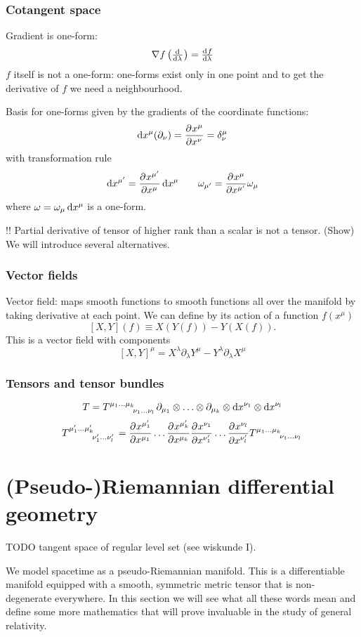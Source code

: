 \subsection{Cotangent space}
Gradient is one-form:
\[ \grad{f}\left(\od{}{\lambda}\right) = \od{f}{\lambda} \]
$f$ itself is not a one-form: one-forms exist only in one point and to get the derivative of $f$ we need a neighbourhood.

Basis for one-forms given by the gradients of the coordinate functions:
\[ \operatorname{d \!}{x^\mu}(\partial_\nu) =  \frac{\partial{^{}}x^\mu}{\partial{{x^\nu}^{}}}  = \delta^\mu_{\nu} \]
with transformation rule
\[ \operatorname{d \!}{x^{\mu'}}=  \frac{\partial{^{}}x^{\mu'}}{\partial{{x^\mu}^{}}} \operatorname{d \!}{x^\mu} \qquad \omega_{\mu'} =  \frac{\partial{^{}}x^\mu}{\partial{{x^{\mu'}}^{}}} \omega_\mu \]
where $\omega = \omega_\mu \operatorname{d \!}{x^\mu}$ is a one-form.

!! Partial derivative of tensor of higher rank than a scalar is not a tensor. (Show)
We will introduce several alternatives.


\subsection{Vector fields}
Vector field: maps smooth functions to smooth functions all over the manifold by taking derivative at each point.
We can define  by its action of a function $f(x^\mu)$
\[ [X,Y](f) \equiv X(Y(f)) - Y(X(f)). \]
This is a vector field with components
\[ [X,Y]^\mu = X^\lambda \partial_\lambda Y^\mu - Y^\lambda\partial_\lambda X^\mu \]

\subsection{Tensors and tensor bundles}
\[ T = \tensor{T}{^{\mu_1}^\ldots^{\mu_k}_{\nu_1}_{\ldots}_{\nu_l}}\partial_{\mu_1}\otimes\ldots\otimes\partial_{\mu_k}\otimes\diff{x}^{\nu_1}\otimes\diff{x}^{\nu_l} \]
\[\tensor{T}{^{\mu'_1}^\ldots^{\mu'_k}_{\nu'_1}_{\ldots}_{\nu'_l}} = \pd{x^{\mu'_1}}{x^{\mu_1}}\ldots\pd{x^{\mu'_k}}{x^{\mu_k}}\pd{x^{\nu_1}}{x^{\nu'_1}}\ldots\pd{x^{\nu_l}}{x^{\nu'_l}}\tensor{T}{^{\mu_1}^\ldots^{\mu_k}_{\nu_1}_{\ldots}_{\nu_l}} \]

\chapter{(Pseudo-)Riemannian differential geometry}

TODO tangent space of regular level set (see wiskunde I).

We model spacetime as a pseudo-Riemannian manifold. This is a differentiable manifold equipped with a smooth, symmetric metric tensor that is non-degenerate everywhere. In this section we will see what all these words mean and define some more mathematics that will prove invaluable in the study of general relativity.

